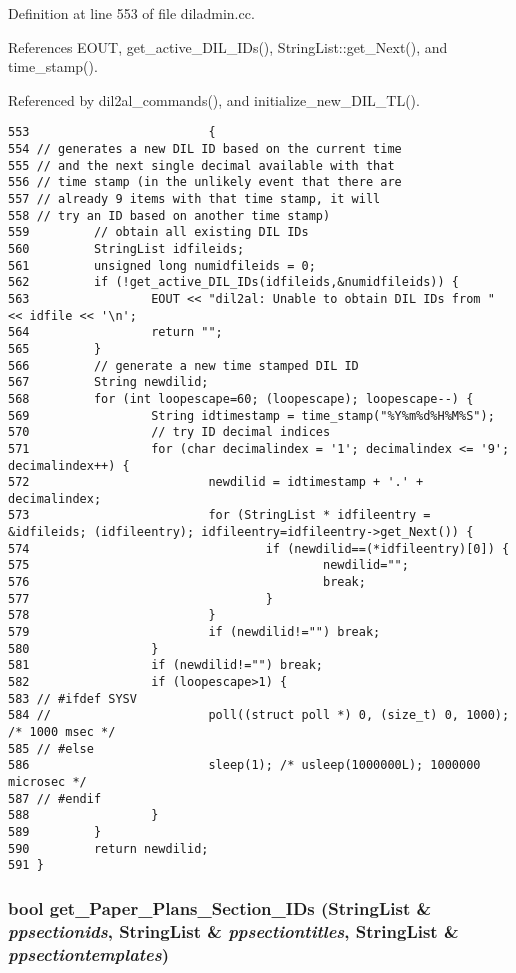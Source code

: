 Definition at line 553 of file diladmin.cc.

References EOUT, get\_\-active\_\-DIL\_\-IDs(), String\-List::get\_\-Next(), and time\_\-stamp().

Referenced by dil2al\_\-commands(), and initialize\_\-new\_\-DIL\_\-TL().



\footnotesize\begin{verbatim}553                         {
554 // generates a new DIL ID based on the current time
555 // and the next single decimal available with that
556 // time stamp (in the unlikely event that there are
557 // already 9 items with that time stamp, it will
558 // try an ID based on another time stamp)
559         // obtain all existing DIL IDs
560         StringList idfileids;
561         unsigned long numidfileids = 0;
562         if (!get_active_DIL_IDs(idfileids,&numidfileids)) {
563                 EOUT << "dil2al: Unable to obtain DIL IDs from " << idfile << '\n';
564                 return "";
565         }
566         // generate a new time stamped DIL ID
567         String newdilid;
568         for (int loopescape=60; (loopescape); loopescape--) { 
569                 String idtimestamp = time_stamp("%Y%m%d%H%M%S");
570                 // try ID decimal indices
571                 for (char decimalindex = '1'; decimalindex <= '9'; decimalindex++) {
572                         newdilid = idtimestamp + '.' + decimalindex;
573                         for (StringList * idfileentry = &idfileids; (idfileentry); idfileentry=idfileentry->get_Next()) {
574                                 if (newdilid==(*idfileentry)[0]) {
575                                         newdilid="";
576                                         break;
577                                 }
578                         }
579                         if (newdilid!="") break;
580                 }
581                 if (newdilid!="") break;
582                 if (loopescape>1) {
583 // #ifdef SYSV
584 //                      poll((struct poll *) 0, (size_t) 0, 1000); /* 1000 msec */
585 // #else
586                         sleep(1); /* usleep(1000000L); 1000000 microsec */
587 // #endif
588                 }
589         }
590         return newdilid;
591 }
\end{verbatim}\normalsize 
{}
\subsubsection{\setlength{\rightskip}{0pt plus 5cm}bool get\_\-Paper\_\-Plans\_\-Section\_\-IDs ({\bf String\-List} \& {\em ppsectionids}, {\bf String\-List} \& {\em ppsectiontitles}, {\bf String\-List} \& {\em ppsectiontemplates})}\label{dil2al_8hh_a349}




